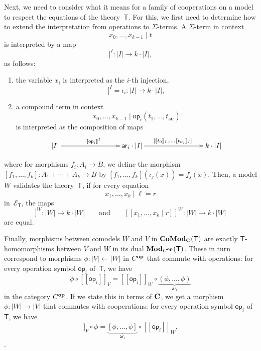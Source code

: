 \documentclass{amsart}
\newcommand{\theory}[1]{\mathsf{#1}} %
\newcommand{\equations}[1]{\mathcal{E}_{\theory{#1}}} %
\newcommand{\ModC}[2]{\text{\textbf{Mod}}_{\category{#1}}(\theory{#2})} %
\newcommand{\ComodC}[2]{\text{\textbf{CoMod}}_{\category{#1}}(\theory{#2})} %
\newcommand{\opcat}[1]{\ensuremath{#1^{\text{\textbf{op}}}}}
\newcommand{\from}{\leftarrow}
\newcommand{\category}[1]{\text{\textbf{#1}}} %
\newcommand{\op}[1]{\mathsf{op}_{#1}} %
\newcommand{\arity}[1]{\mathsf{ar}_{#1}} %
\newcommand{\sem}[1]{[\![#1]\!]} %
\begin{document}
Next, we need to consider what it means for a family of cooperations on a model to respect the equations of the theory~$\theory{T}$. For this, we first need to determine how to extend the interpretation from operations to $\Sigma$-terms. A $\Sigma$-term in context
%
\begin{equation*}
  x_0, \ldots, x_{k-1} \mid t
\end{equation*}
%
is interpreted by a map
%
\begin{equation*}
  \sem{x_0, \ldots, x_{k-1} \mid t}^I : |I| \to k \cdot |I|,
\end{equation*}
%
as follows:
%
\begin{enumerate}
\item the variable $x_i$ is interpreted as the $i$-th injection,
  \begin{equation*}
    \sem{x_0, \ldots, x_{k-1} \mid  x_i}^I = \iota_i : |I| \to k \cdot |I|,
  \end{equation*}
\item a compound term in context
  \begin{equation*}
    x_0, \ldots, x_{k-1} \mid \op{i}(t_1, \ldots, t_{\arity{i}})
  \end{equation*}
  is interpreted as the composition of maps
  \begin{equation*}
    \xymatrix@+6em{
      {|I|} \ar[r]^{\sem{\op{i}}^I}
      &
      {{\arity{i}} \cdot |I|} \ar[r]^{[\sem{t_0}_I, \ldots, \sem{t_{\arity{i}}}_I]}
      &
      {k \cdot |I|}
    }
  \end{equation*}
\end{enumerate}
%
where for morphisms $f_i \colon A_i \to B$, we define the morphism $[f_1, \dots, f_k] \colon A_1 + \cdots + A_k \to B$ by $[f_1, \dots, f_k](\iota_j(x)) = f_j(x)$.
Then, a model $W$ validates the theory~$\theory{T}$, if for every equation
%
\begin{equation*}
  x_1, \ldots, x_k \mid \ell = r
\end{equation*}
%
in~$\equations{T}$, the maps
%
\begin{equation*}
  \sem{x_1, \ldots, x_k \mid \ell}^W : |W| \to k \cdot |W|
  \qquad\text{and}\qquad
  \sem{x_1, \ldots, x_k \mid r}^W : |W| \to k \cdot |W|
\end{equation*}
%
are equal.

Finally, morphisms between comodels $W$ and $V$ in $\ComodC{C}{T}$ are exactly $\theory{T}$-homomorphisms between $V$ and $W$ in its dual $\ModC{\opcat{C}}{T}$. These in turn correspond to morphisms $\phi \colon |V| \from |W|$ in $\opcat{C}$ that commute with operations: for every operation symbol $\op{i}$ of~$\theory{T}$, we have
%
\begin{equation*}
  \phi \circ \sem{\op{i}}_V = \sem{\op{i}}_W \circ \underbrace{(\phi, \ldots, \phi)}_{\arity{i}}
\end{equation*}
in the category $\opcat{C}$. If we state this in terms of $\category{C}$, we get a morphism $\phi \colon |W| \to |V|$ that commutes with cooperations: for every operation symbol $\op{i}$ of~$\theory{T}$, we have
%
\begin{equation*}
  \sem{\op{i}}_V \circ \phi = \underbrace{[\phi, \ldots, \phi]}_{\arity{i}} \circ \sem{\op{i}}_W.
\end{equation*}.
\end{document}
